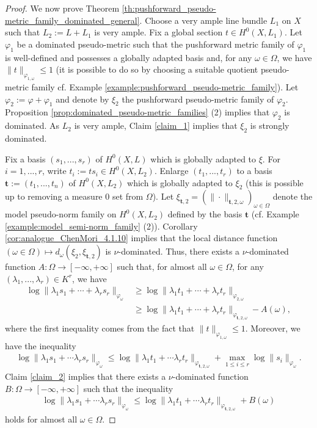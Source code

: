 \documentclass [11pt,reqno]{amsart}
\newcommand{\1}{\mathmybb{1}}
\begin{document}
\begin{proof}
We now prove Theorem \ref{th:pushforward_pseudo-metric_family_dominated_general}. Choose a very ample line bundle $L_{1}$ on $X$ such that $L_2:=L+L_1$ is very ample. Fix a global section $t\in H^{0}(X,L_{1})$. Let $\varphi_1$ be a dominated pseudo-metric such that the pushforward metric family of $\varphi_{1}$ is well-defined and possesses a globally adapted basis and, for any $\omega\in\Omega$, we have $\|t\|_{\varphi_{1,\omega}}\leq 1$ (it is possible to do so by choosing a suitable quotient pseudo-metric family cf. Example \ref{example:pushforward_pseudo-metric_family}). Let $\varphi_{2} := \varphi +\varphi_{1}$ and denote by $\xi_{2}$ the pushforward pseudo-metric family of $\varphi_{2}$. Proposition \ref{prop:dominated_pseudo-metric_families} (2) implies that $\varphi_{2}$ is dominated. As $L_{2}$ is very ample, Claim \ref{claim_1} implies that $\xi_{2}$ is strongly dominated.

Fix a basis $(s_{1},...,s_{r})$ of $H^{0}(X,L)$ which is globally adapted to $\xi$. For $i=1,...,r$, write $t_{i}:=ts_{i} \in H^{0}(X,L_{2})$. Enlarge $(t_{1},...,t_{r})$ to a basis $\mathbf{t}:=(t_{1},...,t_{n})$ of $H^{0}(X,L_2)$ which is globally adapted to $\xi_2$ (this is possible up to removing a measure $0$ set from $\Omega$). Let $\xi_{\mathbf{t},2}=(\|\cdot\|_{\mathbf{t},2,\omega})_{\omega\in\Omega}$ denote the model pseudo-norm family on $H^{0}(X,L_2)$ defined by the basis $\mathbf{t}$ (cf. Example \ref{example:model_semi-norm_family} (2)). Corollary \ref{cor:analogue_ChenMori_4.1.10} implies that the local distance function $(\omega\in\Omega) \mapsto d_{\omega}(\xi_2,\xi_{\mathbf{t},2})$ is $\nu$-dominated. Thus, there exists a $\nu$-dominated function $A:\Omega \to [-\infty,+\infty]$ such that, for almost all $\omega\in\Omega$, for any $(\lambda_1,...,\lambda_r)\in K^{r}$, we have
\begin{align}
\label{eq:pushforward_1}
\log\|\lambda_1 s_1 + \cdots + \lambda_r s_r\|_{\varphi_{\omega}} &\geq \log\|\lambda_1 t_1 + \cdots + \lambda_r t_r\|_{\varphi_{2,\omega}} \nonumber\\
& \geq \log\|\lambda_1 t_1 + \cdots + \lambda_r t_r\|_{\varphi_{\mathbf{t},2,\omega}} - A(\omega), 
\end{align}
where the first inequality comes from the fact that $\|t\|_{\varphi_{1,\omega}}\leq 1$. Moreover, we have the inequality
\begin{align*}
\log\|\lambda_{1}s_1 +\cdots \lambda_r s_r\|_{\varphi_{\omega}} \leq \log\|\lambda_{1}t_1 +\cdots \lambda_r t_r\|_{\varphi_{\mathbf{t},2,\omega}} + \displaystyle\max_{1\leq i \leq r} \log\|s_i\|_{\varphi_{\omega}}.
\end{align*}
Claim \ref{claim_2} implies that there exists a $\nu$-dominated function $B : \Omega \to [-\infty,+\infty]$ such that the inequality
\begin{align}
\label{eq:pushforward_2}
\log\|\lambda_{1}s_1 +\cdots \lambda_r s_r\|_{\varphi_{\omega}} \leq \log\|\lambda_{1}t_1 +\cdots \lambda_r t_r\|_{\varphi_{\mathbf{t},2,\omega}} + B(\omega)
\end{align} 
holds for almost all $\omega\in\Omega$.


\end{proof}
\end{document}
